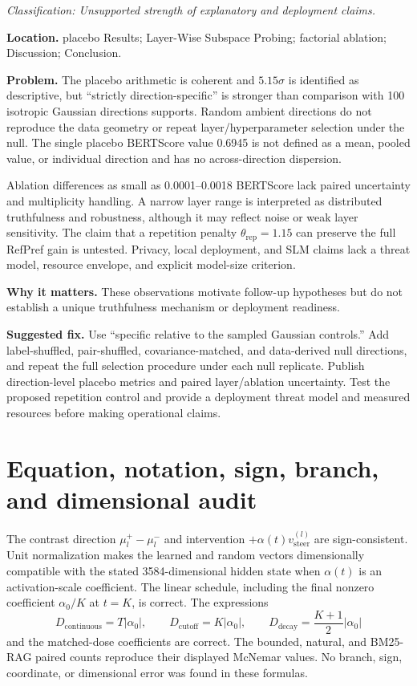\documentclass[11pt]{article}
\newcommand{\findinglabel}[1]{\textbf{#1}}
\newcommand{\classification}[1]{\textit{Classification: #1.}}
\begin{document}
\classification{Unsupported strength of explanatory and deployment claims}

\findinglabel{Location.} placebo Results; Layer-Wise Subspace Probing; factorial ablation; Discussion; Conclusion.

\findinglabel{Problem.} The placebo arithmetic is coherent and $5.15\sigma$ is identified as descriptive, but ``strictly direction-specific'' is stronger than comparison with 100 isotropic Gaussian directions supports.  Random ambient directions do not reproduce the data geometry or repeat layer/hyperparameter selection under the null.  The single placebo BERTScore value 0.6945 is not defined as a mean, pooled value, or individual direction and has no across-direction dispersion.

Ablation differences as small as 0.0001--0.0018 BERTScore lack paired uncertainty and multiplicity handling.  A narrow layer range is interpreted as distributed truthfulness and robustness, although it may reflect noise or weak layer sensitivity.  The claim that a repetition penalty $\theta_{\text{rep}}=1.15$ can preserve the full RefPref gain is untested.  Privacy, local deployment, and SLM claims lack a threat model, resource envelope, and explicit model-size criterion.

\findinglabel{Why it matters.} These observations motivate follow-up hypotheses but do not establish a unique truthfulness mechanism or deployment readiness.

\findinglabel{Suggested fix.} Use ``specific relative to the sampled Gaussian controls.''  Add label-shuffled, pair-shuffled, covariance-matched, and data-derived null directions, and repeat the full selection procedure under each null replicate.  Publish direction-level placebo metrics and paired layer/ablation uncertainty.  Test the proposed repetition control and provide a deployment threat model and measured resources before making operational claims.

\section*{Equation, notation, sign, branch, and dimensional audit}

The contrast direction $\mu_l^+-\mu_l^-$ and intervention $+\alpha(t)v_{\text{steer}}^{(l)}$ are sign-consistent.  Unit normalization makes the learned and random vectors dimensionally compatible with the stated 3584-dimensional hidden state when $\alpha(t)$ is an activation-scale coefficient.  The linear schedule, including the final nonzero coefficient $\alpha_0/K$ at $t=K$, is correct.  The expressions
\[
D_{\text{continuous}}=T|\alpha_0|,
\qquad
D_{\text{cutoff}}=K|\alpha_0|,
\qquad
D_{\text{decay}}=\frac{K+1}{2}|\alpha_0|
\]
and the matched-dose coefficients are correct.  The bounded, natural, and BM25-RAG paired counts reproduce their displayed McNemar values.  No branch, sign, coordinate, or dimensional error was found in these formulas.
\end{document}
